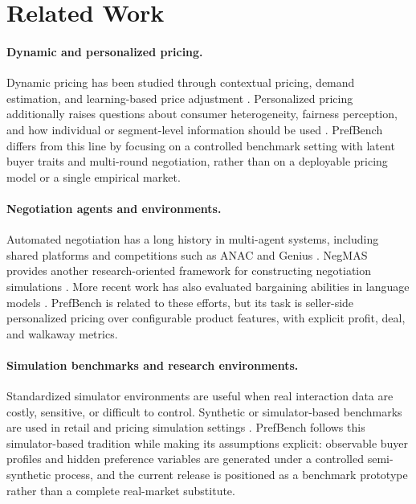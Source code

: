 \section{Related Work}
\label{sec:related_work}

\paragraph{Dynamic and personalized pricing.}
Dynamic pricing has been studied through contextual pricing, demand estimation, and learning-based price adjustment \citep{choi2023SemiParametricContextualPricing,liu2021DynamicPricingEcommerce,pandey2020DeepReinforcementLearning}. Personalized pricing additionally raises questions about consumer heterogeneity, fairness perception, and how individual or segment-level information should be used \citep{biggs2021ModelDistillationRevenue,dube2017PersonalizedPricingConsumer,priester2020SpecialPriceJust}. PrefBench differs from this line by focusing on a controlled benchmark setting with latent buyer traits and multi-round negotiation, rather than on a deployable pricing model or a single empirical market.

\paragraph{Negotiation agents and environments.}
Automated negotiation has a long history in multi-agent systems, including shared platforms and competitions such as ANAC and Genius \citep{baarslag2012FirstAutomatedNegotiating,lin2014GeniusIntegratedEnvironment}. NegMAS provides another research-oriented framework for constructing negotiation simulations \citep{mohammad2021NegMASPlatformAutomated}. More recent work has also evaluated bargaining abilities in language models \citep{xia2024MeasuringBargainingAbilities,chan2024NegotiationToMBenchmarkStresstesting}. PrefBench is related to these efforts, but its task is seller-side personalized pricing over configurable product features, with explicit profit, deal, and walkaway metrics.

\paragraph{Simulation benchmarks and research environments.}
Standardized simulator environments are useful when real interaction data are costly, sensitive, or difficult to control. Synthetic or simulator-based benchmarks are used in retail and pricing simulation settings \citep{xia2023RetailSynthSyntheticData,villarrubia-martin2025DynamicPricingHighSpeed}. PrefBench follows this simulator-based tradition while making its assumptions explicit: observable buyer profiles and hidden preference variables are generated under a controlled semi-synthetic process, and the current release is positioned as a benchmark prototype rather than a complete real-market substitute.
